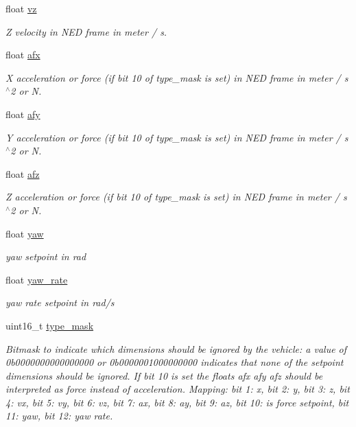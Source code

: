 \begin{DoxyCompactItemize}
float \hyperlink{struct____mavlink__position__target__global__int__t_a2abdd81076b8555f95ee4613a894ccc1}{vz}
\begin{DoxyCompactList}\small\item\em Z velocity in N\+E\+D frame in meter / s. \end{DoxyCompactList}\item 
float \hyperlink{struct____mavlink__position__target__global__int__t_a79c620fe40a4fecc4ea00fb47903a503}{afx}
\begin{DoxyCompactList}\small\item\em X acceleration or force (if bit 10 of type\+\_\+mask is set) in N\+E\+D frame in meter / s$^\wedge$2 or N. \end{DoxyCompactList}\item 
float \hyperlink{struct____mavlink__position__target__global__int__t_a0081ae3f7a2687bd7beb9b0cae941d8e}{afy}
\begin{DoxyCompactList}\small\item\em Y acceleration or force (if bit 10 of type\+\_\+mask is set) in N\+E\+D frame in meter / s$^\wedge$2 or N. \end{DoxyCompactList}\item 
float \hyperlink{struct____mavlink__position__target__global__int__t_ad51c1026b3ab247bff29022de4ef5b09}{afz}
\begin{DoxyCompactList}\small\item\em Z acceleration or force (if bit 10 of type\+\_\+mask is set) in N\+E\+D frame in meter / s$^\wedge$2 or N. \end{DoxyCompactList}\item 
float \hyperlink{struct____mavlink__position__target__global__int__t_a81b18710800d7cb3100c77a73bc1a908}{yaw}
\begin{DoxyCompactList}\small\item\em yaw setpoint in rad \end{DoxyCompactList}\item 
float \hyperlink{struct____mavlink__position__target__global__int__t_a6c4f587a649a0bc0b35087a7de515ab1}{yaw\+\_\+rate}
\begin{DoxyCompactList}\small\item\em yaw rate setpoint in rad/s \end{DoxyCompactList}\item 
uint16\+\_\+t \hyperlink{struct____mavlink__position__target__global__int__t_a62c3974a44a8f2c189ed1cbf3b7536d6}{type\+\_\+mask}
\begin{DoxyCompactList}\small\item\em Bitmask to indicate which dimensions should be ignored by the vehicle\+: a value of 0b0000000000000000 or 0b0000001000000000 indicates that none of the setpoint dimensions should be ignored. If bit 10 is set the floats afx afy afz should be interpreted as force instead of acceleration. Mapping\+: bit 1\+: x, bit 2\+: y, bit 3\+: z, bit 4\+: vx, bit 5\+: vy, bit 6\+: vz, bit 7\+: ax, bit 8\+: ay, bit 9\+: az, bit 10\+: is force setpoint, bit 11\+: yaw, bit 12\+: yaw rate. \end{DoxyCompactList}\item 

\end{DoxyCompactItemize}
